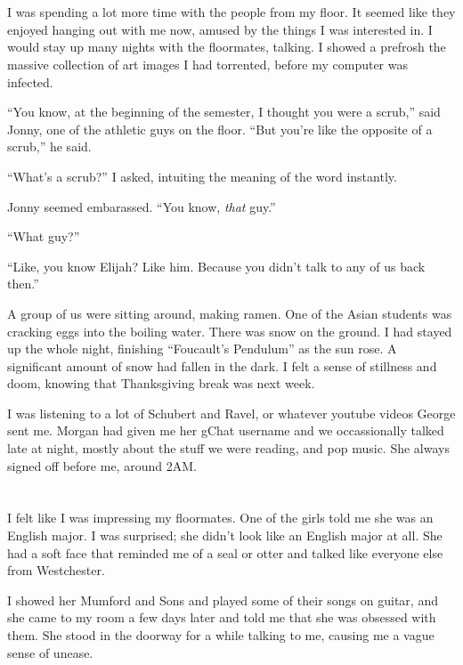 \section{}

I was spending a lot more time with the people from my floor.  It seemed like
they enjoyed hanging out with me now, amused by the things I was interested in.
I would stay up many nights with the floormates, talking.  I showed a prefrosh
the massive collection of art images I had torrented, before my computer was
infected.   

``You know, at the beginning of the semester, I thought you were a scrub,'' said
Jonny, one of the athletic guys on the floor.  ``But you're like the opposite of
a scrub,'' he said.  

``What's a scrub?''  I asked, intuiting the meaning of the word instantly.

Jonny seemed embarassed.  ``You know, \textit{that} guy.''

``What guy?''

``Like, you know Elijah?  Like him.  Because you didn't talk to any of us back
then.''  

A group of us were sitting around, making ramen.  One of the Asian students was
cracking eggs into the boiling water.  There was snow on the ground.  I had
stayed up the whole night, finishing ``Foucault's Pendulum'' as the sun rose.  A
significant amount of snow had fallen in the dark.  I felt a sense of stillness
and doom, knowing that Thanksgiving break was next week. 


I was listening to a lot of Schubert and Ravel, or whatever youtube videos
George sent me.  Morgan had given me her gChat username and we occassionally
talked late at night, mostly about the stuff we were reading, and pop music.
She always signed off before me, around 2AM.

\section{}

I felt like I was impressing my floormates.  One of the girls told me she was an
English major.  I was surprised; she didn't look like an English major at all.
She had a soft face that reminded me of a seal or otter and talked like everyone
else from Westchester.  

I showed her Mumford and Sons and played some of their songs on guitar, and she
came to my room a few days later and told me that she was obsessed with them.
She stood in the doorway for a while talking to me, causing me a vague sense of
unease.

